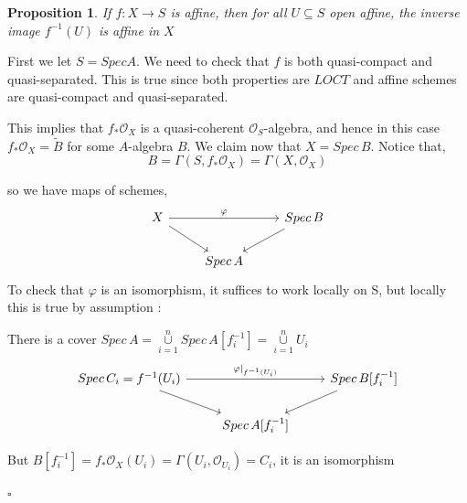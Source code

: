 \documentclass{article}
\newtheorem{proposition}[theorem]{Proposition}
\newenvironment{Proof}{{\noindent \indent \it Proof:\quad}}{\hfill $\square$\par}
\begin{document}
\begin{proposition}
If $f : X \to S$ is affine, then for all $U \subseteq S$ open affine, the inverse image $f^{-1}(U)$
is affine in $X$
\end{proposition}
\begin{Proof}
    First we let $S = Spec A$. We need to check that $f$ is both quasi-compact and quasi-separated.
This is true since both properties are $LOCT$ and affine schemes are quasi-compact and quasi-separated.

This implies that $f_\ast\mathcal O_X$ is a quasi-coherent $\mathcal O_S$-algebra, and hence in this case $f_\ast\mathcal O_X = \widetilde B$ for some
$A$-algebra $B$. We claim now that $X = Spec\, B$. Notice that,
$$
B = \Gamma(S, f_\ast\mathcal O_X) = \Gamma(X, \mathcal O_X)
$$

so we have maps of schemes,
\[\begin{tikzcd}
	X && {Spec\,B} \\
	& {Spec\, A}
	\arrow[from=1-1, to=2-2]
	\arrow[from=1-3, to=2-2]
	\arrow["\varphi", from=1-1, to=1-3]
\end{tikzcd}\]
To check that $\varphi$ is an isomorphism, it suffices to work locally on S, but locally this is true by assumption :

There is a cover $Spec\,A
=\mathop{\cup}\limits_{i=1}^n Spec\,A[f_i^{-1}]
=\mathop{\cup}\limits_{i=1}^n U_i$
\[\begin{tikzcd}
	{Spec\, C_i=f^{-1}(U_i)} && {Spec\,B[f_i^{-1}]} \\
	& {Spec\, A[f_i^{-1}]}
	\arrow[from=1-1, to=2-2]
	\arrow[from=1-3, to=2-2]
	\arrow["{\varphi|_{f^{-1}(U_i)}}", from=1-1, to=1-3]
\end{tikzcd}\]

But $B[f_i^{-1}]=f_\ast\mathcal O_X(U_i)=\Gamma(U_i,\mathcal O_{U_i})=C_i$, it is an isomorphism

\end{Proof}
\end{document}
